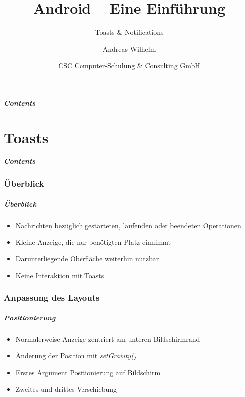 \title{Android -- Eine Einführung}
\subtitle{Toasts \& Notifications}
\author[A. Wilhelm]{Andreas Wilhelm}
\titlegraphic{}
\date{CSC Computer-Schulung \& Consulting GmbH}

\begin{frame}[plain]
  \titlepage
\end{frame}

\section[Contents]{}
\begin{frame}
	\frametitle{Contents}
	\tableofcontents[onlyparts]
\end{frame}

\part{Toasts}
\frame{\partpage}
\begin{frame}
	\frametitle{Contents}
	\tableofcontents[]
\end{frame}

\section{Überblick}
\begin{frame}
   \frametitle{Überblick}
   \begin{itemize}
      \item Nachrichten bezüglich gestarteten, laufenden oder beendeten 
         Operationen
      \item Kleine Anzeige, die nur benötigten Platz einnimmt
      \item Darunterliegende Oberfläche weiterhin nutzbar
      \item Keine Interaktion mit Toasts
   \end{itemize}

   
\end{frame}

\section{Anpassung des Layouts}
\begin{frame}
   \frametitle{Positionierung}
   \begin{itemize}
      \item Normalerweise Anzeige zentriert am unteren Bildschirmrand
      \item Änderung der Position mit \emph{setGravity()}
      \item Erstes Argument Positionierung auf Bildschirm
      \item Zweites und drittes Verschiebung
   \end{itemize}

   
\end{frame}

